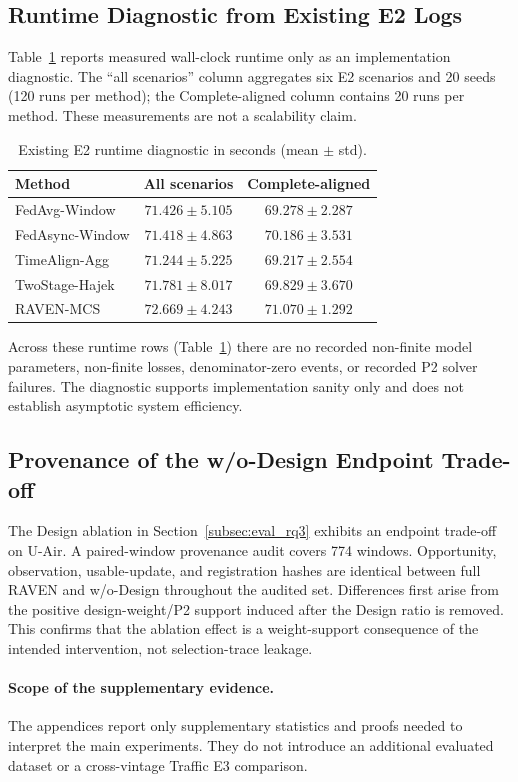 \subsection{Runtime Diagnostic from Existing E2 Logs}
\label{app:runtime}

Table~\ref{tab:app_runtime} reports measured wall-clock runtime only as an
implementation diagnostic.  The ``all scenarios'' column aggregates six
E2 scenarios and 20 seeds (120 runs per method); the Complete-aligned column
contains 20 runs per method.  These measurements are not a scalability claim.

\begin{table}[!htbp]
\centering
\caption{Existing E2 runtime diagnostic in seconds (mean $\pm$ std).}
\label{tab:app_runtime}
\footnotesize
\setlength{\tabcolsep}{3.5pt}
\begin{tabular*}{\columnwidth}{@{\extracolsep{\fill}}lcc}
\toprule
Method & All scenarios & Complete-aligned\\
\midrule
FedAvg-Window & $71.426\pm5.105$ & $69.278\pm2.287$ \\
FedAsync-Window & $71.418\pm4.863$ & $70.186\pm3.531$ \\
TimeAlign-Agg & $71.244\pm5.225$ & $69.217\pm2.554$ \\
TwoStage-Hajek & $71.781\pm8.017$ & $69.829\pm3.670$ \\
RAVEN-MCS & $72.669\pm4.243$ & $71.070\pm1.292$ \\
\bottomrule
\end{tabular*}
\end{table}

Across these runtime rows (Table~\ref{tab:app_runtime}) there are no recorded
non-finite model parameters, non-finite losses, denominator-zero events, or
recorded P2 solver failures.  The diagnostic supports implementation sanity only and does not
establish asymptotic system efficiency.

\subsection{Provenance of the w/o-Design Endpoint Trade-off}
\label{app:design_provenance}

The Design ablation in Section~\ref{subsec:eval_rq3} exhibits an endpoint
trade-off on U-Air.  A paired-window provenance audit covers
774 windows.  Opportunity, observation, usable-update, and
registration hashes are identical between full RAVEN and w/o-Design throughout
the audited set.  Differences first arise from the positive design-weight/P2
support induced after the Design ratio is removed.  This confirms that the
ablation effect is a weight-support consequence of the intended intervention,
not selection-trace leakage.

\paragraph{Scope of the supplementary evidence.}
The appendices report only supplementary statistics and proofs needed to
interpret the main experiments.  They do not introduce an additional
evaluated dataset or a cross-vintage Traffic E3 comparison.

